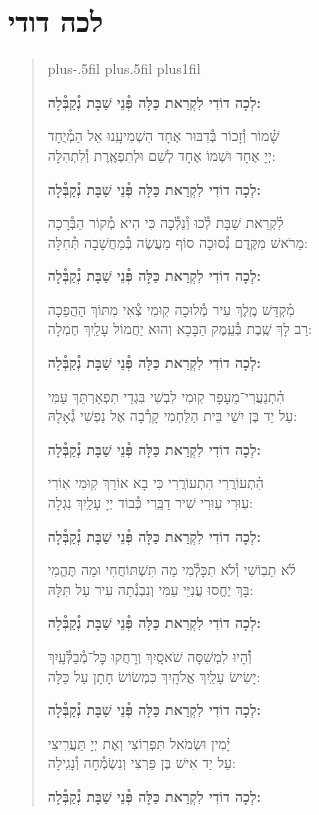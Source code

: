 \documentclass[twoside, openany, parskip=half, 11pt]{book}
\begin{document}
\section*{ לכה דודי }

\newcommand{\lechadodi}{\textbf{לְכָה דוֹדִי לִקְרַאת כַּלָּה פְּ֯נֵי שַׁבָּת נְ֯קַבְּ֯לָה:}}

\begin{quote}
\leftskip=0pt plus-.5fil
\rightskip=0pt plus.5fil
\parfillskip=0pt plus1fil


\lechadodi

שָׁ֗מוֹר וְ֯זָכוֹר בְּ֯דִבּוּר אֶחָד \hfill
הִשְׁמִיעָֽנוּ אֵל הַמְ֯יֻחָד \\
יְיָ אֶחָד וּשְׁמוֹ אֶחָד \hfill
לְשֵׁם וּלְתִפְאֶֽרֶת וְ֯לִתְהִלָּה:

\lechadodi

לִ֗קְרַאת שַׁבָּת לְ֯כוּ וְ֯נֵלְ֯כָה \hfill
כִּי הִיא מְ֯קוֹר הַבְּ֯רָכָה \\
מֵרֹאשׁ מִקֶּֽדֶם נְ֯סוּכָה \hfill
סוֹף מַעֲשֶׂה בְּ֯מַחֲשָׁבָה תְּ֯חִלָּה:

\lechadodi

מִ֗קְדַּשׁ מֶֽלֶךְ עִיר מְ֯לוּכָה \hfill
קֽוּמִי צְ֯אִי מִתּוֹךְ הַהֲפֵכָה \\
רַב לָךְ שֶֽׁבֶת בְּ֯עֵֽמֶק הַבָּכָא \hfill
וְהוּא יַחֲמוֹל עָלַֽיִךְ חֶמְלָה:

\lechadodi

הִ֗תְנַעֲרִי־מֵעָפָר קֽוּמִי \hfill
לִבְשִׁי בִּגְדֵי תִפְאַרְתֵּךְ עַמִּי \\
עַל יַד בֶּן יִשַׁי בֵּית הַלַּחְמִי \hfill
קָרְ֯בָה אֶל נַפְשִׁי גְ֯אָלָהּ:

\lechadodi

הִ֗תְעוֹרֲרִי הִתְעוֹרֲרִי \hfill
כִּי בָא אוֹרֵךְ קֽוּמִי אֽוֹרִי \\
עֽוּרִי עֽוּרִי שִׁיר דַבֵּֽרִי \hfill
כְּ֯בוֹד יְיָ עָלַֽיִךְ נִגְלָה:

\lechadodi

לֹ֗א תֵבֽוֹשִׁי וְ֯לֹא תִכָּלְ֯מִי \hfill
מַה תִּשְׁתּוֹחֲחִי וּמַה תֶּהֱמִי \\
בָּךְ יֶחֱסוּ עֲנִיֵּי עַמִּי \hfill
וְנִבְנְ֯תָה עִיר עַל תִּלָּהּ:

\lechadodi

וְ֯֗הָיוּ לִמְשִׁסָּה שֹׁאסָֽיִךְ \hfill
וְרָחֲקוּ כׇּל־מְ֯בַלְּ֯עָֽיִךְ \\
יָשִׂישׂ עָלַֽיִךְ אֱלֹהָֽיִךְ \hfill
כִּמְשׂוֹשׂ חָתָן עַל כַּלָּה:

\lechadodi

יָ֗מִין וּשְׂמֹאל תִּפְרֽוֹצִי \hfill
וְאֶת יְיָ תַּעֲרִֽיצִי \\
עַל יַד אִישׁ בֶּן פַּרְצִי \hfill
וְנִשְׂמְ֯חָה וְ֯נָגִֽילָה:

\lechadodi

\end{quote}
\end{document}
